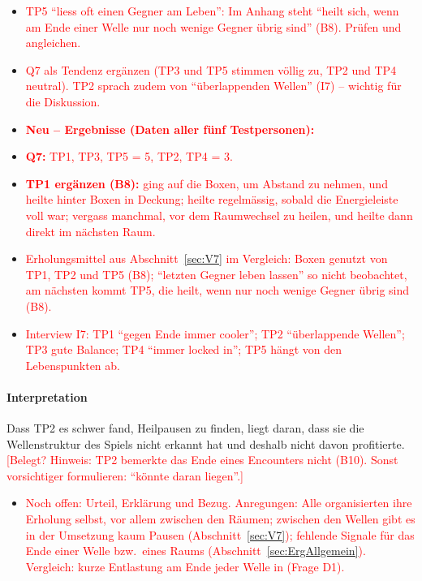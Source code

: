 \documentclass[../Main.tex]{subfiles}
\begin{document}
\begin{itemize}[leftmargin=1.5cm]
    \item \textcolor{red}{TP5 \enquote{liess oft einen Gegner am Leben}: Im Anhang steht \enquote{heilt sich, wenn am Ende einer Welle nur noch wenige Gegner übrig sind} (B8). Prüfen und angleichen.}
    \item \textcolor{red}{Q7 als Tendenz ergänzen (TP3 und TP5 stimmen völlig zu, TP2 und TP4 neutral). TP2 sprach zudem von \enquote{überlappenden Wellen} (I7) -- wichtig für die Diskussion.}
\end{itemize}

\begin{itemize}[leftmargin=1.5cm]
    \item \textcolor{red}{\textbf{Neu -- Ergebnisse (Daten aller fünf Testpersonen):}}
    \item \textcolor{red}{\textbf{Q7:} TP1, TP3, TP5 = 5, TP2, TP4 = 3.}
    \item \textcolor{red}{\textbf{TP1 ergänzen (B8):} ging auf die Boxen, um Abstand zu nehmen, und heilte hinter Boxen in Deckung; heilte regelmässig, sobald die Energieleiste voll war; vergass manchmal, vor dem Raumwechsel zu heilen, und heilte dann direkt im nächsten Raum.}
    \item \textcolor{red}{Erholungsmittel aus Abschnitt~\ref{sec:V7} im Vergleich: Boxen genutzt von TP1, TP2 und TP5 (B8); \enquote{letzten Gegner leben lassen} so nicht beobachtet, am nächsten kommt TP5, die heilt, wenn nur noch wenige Gegner übrig sind (B8).}
    \item \textcolor{red}{Interview I7: TP1 \enquote{gegen Ende immer cooler}; TP2 \enquote{überlappende Wellen}; TP3 gute Balance; TP4 \enquote{immer locked in}; TP5 hängt von den Lebenspunkten ab.}
\end{itemize}

\paragraph{Interpretation}
Dass TP2 es schwer fand, Heilpausen zu finden, liegt daran, dass sie die Wellenstruktur des Spiels nicht erkannt hat und deshalb nicht davon profitierte. \textcolor{red}{[Belegt? Hinweis: TP2 bemerkte das Ende eines Encounters nicht (B10). Sonst vorsichtiger formulieren: \enquote{könnte daran liegen}.]}

\begin{itemize}[leftmargin=1.5cm]
    \item \textcolor{red}{Noch offen: Urteil, Erklärung und Bezug. Anregungen: Alle organisierten ihre Erholung selbst, vor allem zwischen den Räumen; zwischen den Wellen gibt es in der Umsetzung kaum Pausen (Abschnitt~\ref{sec:V7}); fehlende Signale für das Ende einer Welle bzw.\ eines Raums (Abschnitt~\ref{sec:ErgAllgemein}). Vergleich: kurze Entlastung am Ende jeder Welle in  (Frage D1).}
\end{itemize}
\end{document}
